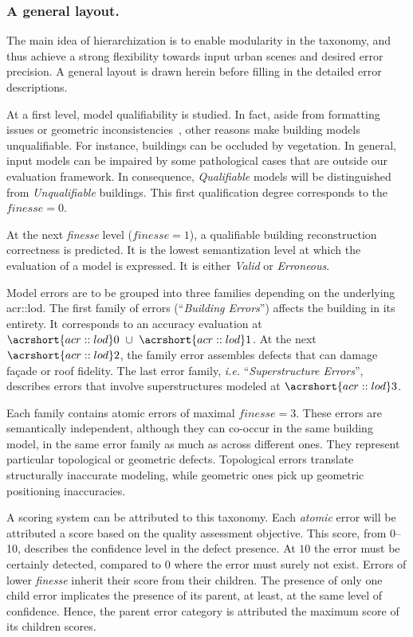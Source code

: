 \documentclass[runningheads]{llncs}
\begin{document}
\subsubsection{A general layout.}
The main idea of hierarchization is to enable modularity in the taxonomy, and thus achieve a strong flexibility towards input urban scenes and desired error precision. A general layout is drawn herein before filling in the detailed error descriptions.

At a first level, model qualifiability is studied. In fact, aside from formatting issues or geometric inconsistencies~\cite{ledoux2018val3dity}, other reasons make building models unqualifiable. For instance, buildings can be occluded by vegetation. In general, input models can be impaired by some pathological cases that are outside our evaluation framework. In consequence, \textit{Qualifiable} models will be distinguished from \textit{Unqualifiable} buildings. This first qualification degree corresponds to the $\textit{finesse} = 0$.

At the next \textit{finesse} level ($\textit{finesse} = 1$), a qualifiable building reconstruction correctness is predicted. It is the lowest semantization level at which the evaluation of a model is expressed. It is either \textit{Valid} or \textit{Erroneous}.

Model errors are to be grouped into three families depending on the underlying \acrshort{acr::lod}. The first family of errors (``\textit{Building Errors}'') affects the building in its entirety. It corresponds to an accuracy evaluation at $\acrshort{acr::lod}0\text{ } \cup \text{ }\acrshort{acr::lod}1$. At the next $\acrshort{acr::lod}2$, the family error assembles defects that can damage fa\c{c}ade or roof fidelity. The last error family, \textit{i.e.} ``\textit{Superstructure Errors}'', describes errors that involve superstructures modeled at $\acrshort{acr::lod}3$.

Each family contains atomic errors of maximal $\textit{finesse} = 3$. These errors are semantically independent, although they can co-occur in the same building model, in the same error family as much as across different ones. They represent particular topological or geometric defects. Topological errors translate structurally inaccurate modeling, while geometric ones pick up geometric positioning inaccuracies.

A scoring system can be attributed to this taxonomy. Each \textit{atomic} error will be attributed a score based on the quality assessment objective. This score, from \SIrange{0}{10}{}, describes the confidence level in the defect presence. At $10$ the error must be certainly detected, compared to $0$ where the error must surely not exist. Errors of lower \textit{finesse} inherit their score from their children. The presence of only one child error implicates the presence of its parent, at least, at the same level of confidence. Hence, the parent error category is attributed the maximum score of its children scores.
\end{document}
